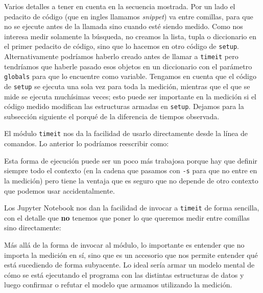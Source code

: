 Varios detalles a tener en cuenta en la secuencia mostrada. Por un lado el pedacito de código (que en ingles llamamos \textit{snippet}) va entre comillas, para que no se ejecute antes de la llamada sino cuando esté siendo medido. Como nos interesa medir solamente la búsqueda, no creamos la lista, tupla o diccionario en el primer pedacito de código, sino que lo hacemos en otro código de \texttt{setup}. Alternativamente podríamos haberlo creado antes de llamar a \texttt{timeit} pero tendríamos que haberle pasado esos objetos en un diccionario con el parámetro \texttt{globals} para que lo encuentre como variable. Tengamos en cuenta que el código de \texttt{setup} se ejecuta una sola vez para toda la medición, mientras que el que se mide se ejecuta muchísimas veces; esto puede ser importante en la medición si el código medido modifican las estructuras armadas en \texttt{setup}. Dejamos para la subsección siguiente el porqué de la diferencia de tiempos observada.

El módulo \texttt{timeit} nos da la facilidad de usarlo directamente desde la línea de comandos. Lo anterior lo podríamos reescribir como:


Esta forma de ejecución puede ser un poco más trabajosa porque hay que definir siempre todo el contexto (en la cadena que pasamos con \texttt{-s} para que no entre en la medición) pero tiene la ventaja que es seguro que no depende de otro contexto que podemos usar accidentalmente.

Los Jupyter Notebook nos dan la facilidad de invocar a \texttt{timeit} de forma sencilla, con el detalle que \textbf{no} tenemos que poner lo que queremos medir entre comillas sino directamente:


Más allá de la forma de invocar al módulo, lo importante es entender que no importa la medición en sí, sino que es un accesorio que nos permite entender qué está sucediendo de forma subyacente. Lo ideal sería armar un modelo mental de cómo se está ejecutando el programa con las distintas estructuras de datos y luego confirmar o refutar el modelo que armamos utilizando la medición.


